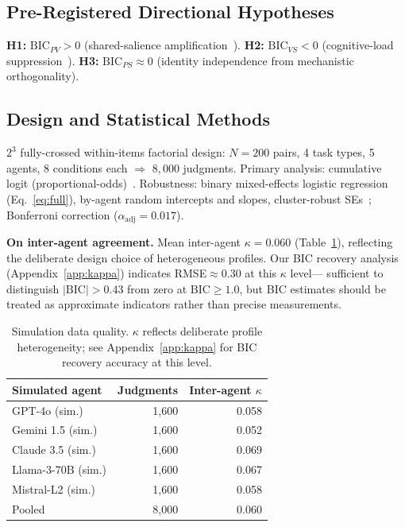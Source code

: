 \documentclass[10pt,conference]{IEEEtran}
\newcommand{\BIC}{\mathrm{BIC}}
\begin{document}
\subsection{Pre-Registered Directional Hypotheses}

\textbf{H1:} $\BIC_{PV}{>}0$ (shared-salience
amplification~\cite{wu2023style,shi2024position}).
\textbf{H2:} $\BIC_{VS}{<}0$ (cognitive-load
suppression~\cite{panickssery2024llm}).
\textbf{H3:} $\BIC_{PS}{\approx}0$ (identity independence
from mechanistic orthogonality).

\subsection{Design and Statistical Methods}

$2^3$ fully-crossed within-items factorial design:
$N{=}200$ pairs, 4 task types, 5 agents, 8 conditions each
$\Rightarrow$ $8{,}000$ judgments.
Primary analysis: cumulative logit
(proportional-odds)~\cite{brant1990}.
Robustness: binary mixed-effects logistic regression
(Eq.~\ref{eq:full}), by-agent random intercepts and slopes,
cluster-robust SEs~\cite{bates2015};
Bonferroni correction ($\alpha_\text{adj}{=}0.017$).

\textbf{On inter-agent agreement.}
Mean inter-agent $\kappa{=}0.060$ (Table~\ref{tab:quality}),
reflecting the deliberate design choice of heterogeneous
profiles.
Our BIC recovery analysis (Appendix~\ref{app:kappa})
indicates RMSE${\approx}0.30$ at this $\kappa$ level---
sufficient to distinguish $|\BIC|{>}0.43$ from zero
at $\BIC{\geq}1.0$, but BIC estimates should be treated
as approximate indicators rather than precise measurements.

\begin{table}[htbp]
\centering
\caption{Simulation data quality. $\kappa$ reflects deliberate
profile heterogeneity; see Appendix~\ref{app:kappa} for
BIC recovery accuracy at this level.}
\label{tab:quality}
\small
\begin{tabular}{lrr}
\toprule
\textbf{Simulated agent} & \textbf{Judgments} &
  \textbf{Inter-agent $\kappa$} \\
\midrule
GPT-4o (sim.)      & 1,600 & 0.058 \\
Gemini 1.5 (sim.)  & 1,600 & 0.052 \\
Claude 3.5 (sim.)  & 1,600 & 0.069 \\
Llama-3-70B (sim.) & 1,600 & 0.067 \\
Mistral-L2 (sim.)  & 1,600 & 0.058 \\
\midrule
Pooled             & 8,000 & 0.060 \\
\bottomrule
\end{tabular}
\end{table}
\end{document}
